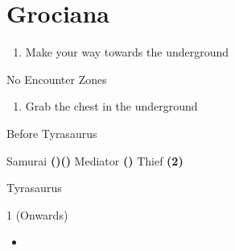 \chapter{Grociana}

\vspace{\baselineskip}

\begin{paracol}{2}

\begin{enumerate}
    \item Make your way towards the underground
\end{enumerate}

\switchcolumn
\begin{steproute}{No Encounter Zones}
\end{steproute}

\switchcolumn
\resume
\begin{enumerate}[resume]
    \item Grab the  chest in the underground
\end{enumerate}

\begin{menu}{Before Tyrasaurus}
    \varwb
    \begin{jobMenu}
        \bartz Samurai \textbf{(\pointLeft)(\pointDown)}
        \lenna Mediator \textbf{(\pointUp)}
        \galuf Thief \textbf{(2\pointRight)}
    \end{jobMenu}
    \begin{itemMenu}
        \hiPotionMenu {}
    \end{itemMenu}
    \varwe
\end{menu}

\begin{boss}{Tyrasaurus}
    \varwb
    \begin{round}{1 (Onwards)}
        \everyone \phoenixDown \space \then {}
    \end{round}
    \begin{itemize}
        \item \newbox\backup \sbox{} \bossHl{{\usebox\backup}} 
        \begin{itemize}
            \anyone \elixir \space \then {}
            \anyone \potion \space \then {}
        \end{itemize}
    \end{itemize}
    \varwe
\end{boss}


\end{paracol}
